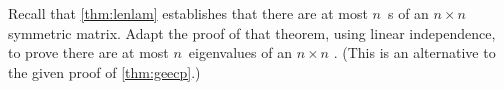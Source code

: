 \begin{exercise} \label{ex:lenlam} 
Recall that \cref{thm:lenlam} establishes that there are at most \(n\)~s of an \(n\times n\) symmetric matrix.
Adapt the proof of that theorem, using linear independence, to prove there are at most \(n\)~eigenvalues of an \(n\times n\) .
(This is an alternative to the given proof of \cref{thm:geecp}.)
\end{exercise}




